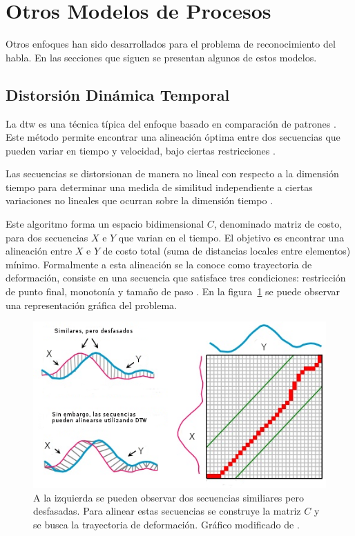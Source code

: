 \section{Otros Modelos de Procesos}
\label{sec:otrosModelos}

Otros enfoques han sido desarrollados para el problema de reconocimiento del habla. En las secciones que siguen
se presentan algunos de estos modelos.

\subsection{Distorsi\'on Din\'amica Temporal}
\label{sec:dtw}

La \gls{dtw} es una t\'ecnica t\'ipica del enfoque basado en comparaci\'on de 
patrones \cite{GaikwadAReview2010}. 
Este m\'etodo permite encontrar una alineaci\'on \'optima entre dos secuencias que pueden variar en 
tiempo y velocidad, bajo ciertas restricciones \cite{MullerInformation2007}.

Las secuencias se distorsionan de manera no lineal con respecto a la dimensi\'on tiempo para determinar 
una medida de similitud independiente a ciertas variaciones no lineales que ocurran sobre la 
dimensi\'on tiempo \cite{AnusuyaSpeech2009}.

Este algoritmo forma un espacio bidimensional $C$, denominado matriz de costo, para dos secuencias 
$X$ e $Y$ que varian en el tiempo. El objetivo es encontrar
una alineaci\'on entre $X$ e $Y$ de costo total (suma de distancias locales entre elementos) m\'inimo. 
Formalmente a esta alineaci\'on se la conoce como trayectoria de
deformaci\'on, consiste en una secuencia que satisface tres condiciones: restricci\'on de punto final, 
monoton\'ia y tama\~no de paso \cite{MullerInformation2007}. 
En la figura~\ref{figure:dtw} se puede observar una representaci\'on gr\'afica del problema.

\begin{figure}[H]
\centering
\includegraphics[width=0.8\linewidth]{./graphics/dtw.png}
\caption[Alineaci\'on de secuencias mediante distorsi\'on din\'amica temporal.]{A la izquierda 
    se pueden observar dos secuencias similiares pero desfasadas. Para alinear estas secuencias 
    se construye la matriz $C$ y se busca la trayectoria de deformaci\'on. 
    Gr\'afico modificado de \cite{ThanawinDTW}.}
\label{figure:dtw}
\end{figure}

